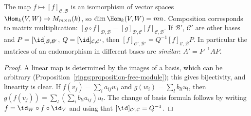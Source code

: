 \begin{proposition}\label{linear-algebra:proposition-matrices}
The map $f \mapsto [f]_{\mathcal{C}, \mathcal{B}}$ is an isomorphism of vector spaces
$\Hom_k(V, W) \to M_{m \times n}(k)$, so $\dim \Hom_k(V, W) = mn$. Composition corresponds to matrix
multiplication: $[g \circ f]_{\mathcal{D}, \mathcal{B}} = [g]_{\mathcal{D}, \mathcal{C}}[f]_{\mathcal{C}, \mathcal{B}}$. If
$\mathcal{B}'$, $\mathcal{C}'$ are other bases and $P = [\id]_{\mathcal{B}, \mathcal{B}'}$,
$Q = [\id]_{\mathcal{C}, \mathcal{C}'}$, then $[f]_{\mathcal{C}', \mathcal{B}'} = Q^{-1}[f]_{\mathcal{C}, \mathcal{B}}P$.
In particular the matrices of an endomorphism in different bases are \emph{similar}:
$A' = P^{-1}AP$.
\end{proposition}

\begin{proof}
A linear map is determined by the images of a basis, which can be arbitrary
(Proposition~\ref{rings:proposition-free-module}); this gives bijectivity, and linearity is clear.
If $f(v_j) = \sum_i a_{ij}w_i$ and $g(w_i) = \sum_l b_{li}u_l$, then
$g(f(v_j)) = \sum_l (\sum_i b_{li}a_{ij}) u_l$. The change of basis formula follows by writing
$f = \id_W \circ f \circ \id_V$ and using that $[\id]_{\mathcal{C}', \mathcal{C}} = Q^{-1}$.
\end{proof}


